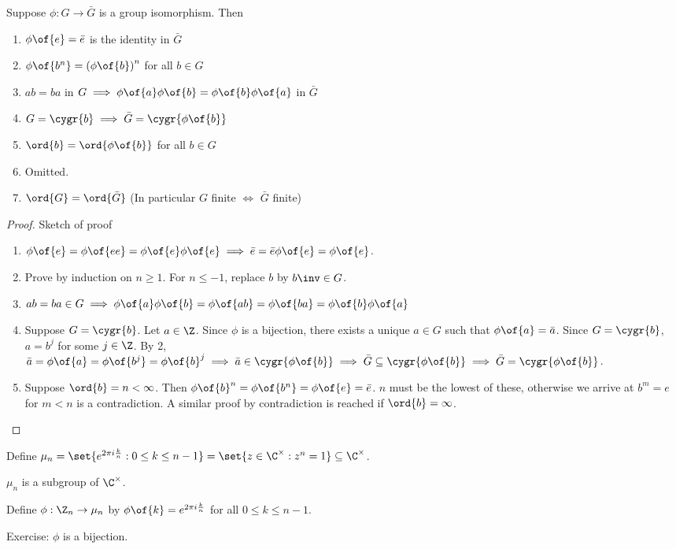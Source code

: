 \begin{theorem}
    Suppose $\phi: G \to \bar{G}$ is a group isomorphism. Then 
    \begin{enumerate}
        \item $\phi\of{e} = \bar{e}$ is the identity in $\bar{G}$
        \item $\phi\of{b^n} = \left(\phi\of{b}\right)^n$ for all $b \in G$
        \item $ab = ba$ in $G \implies \phi\of{a} \phi\of{b} = \phi\of{b} \phi\of{a}$ in $\bar{G}$
        \item $G = \cygr{b} \implies \bar{G} = \cygr{\phi\of{b}}$
        \item $\ord{b} = \ord{\phi\of{b}}$ for all $b \in G$
        \item Omitted.
        \item $\ord{G} = \ord{\bar{G}}$ (In particular $G$ finite $\iff$ $\bar{G}$ finite)
    \end{enumerate}
\end{theorem}
\begin{proof}
    Sketch of proof\begin{enumerate}
        \item $\phi\of{e} = \phi\of{ee} = \phi\of{e} \phi\of{e} \implies \bar{e} = \bar{e}\phi\of{e} = \phi\of{e}$.
        \item Prove by induction on $n \geq 1$. For $n \leq -1$, replace $b$ by $b\inv \in G$.
        \item $ab = ba \in G \implies \phi\of{a} \phi\of{b} = \phi\of{ab} = \phi\of{ba} = \phi\of{b} \phi\of{a}$
        \item Suppose $G = \cygr{b}$. Let $a \in \Z$. Since $\phi$ is a bijection, there exists a unique $a \in G$ such that $\phi\of{a} = \bar{a}$. Since $G = \cygr{b}$, $a = b^j$ for some $j \in \Z$. By 2, $\bar{a} = \phi\of{a} = \phi\of{b^j} = \phi\of{b}^j \implies \bar{a} \in \cygr{\phi\of{b}} \implies \bar{G} \subseteq \cygr{\phi\of{b}} \implies \bar{G} = \cygr{\phi\of{b}}$.
        \item Suppose $\ord{b} = n < \infty$. Then $\phi\of{b}^n = \phi\of{b^n} = \phi\of{e} = \bar{e}$. $n$ must be the lowest of these, otherwise we arrive at $b^m = e$ for $m < n$ is a contradiction. A similar proof by contradiction is reached if $\ord{b} = \infty$.
    \end{enumerate}
\end{proof}

\begin{example}
    Define $\mu_n = \set{e^{2\pi i \frac{k}{n}}: 0 \leq k \leq n - 1} = \set{z \in \C^\times: z^n = 1} \subseteq \C^\times$.

    $\mu_n$ is a subgroup of $\C^\times$.

    Define $\phi: \Z_n \to \mu_n$ by $\phi\of{k} = e^{2\pi i \frac{k}{n}}$ for all $0 \leq k \leq n - 1$.
    
    Exercise: $\phi$ is a bijection.
\end{example}

